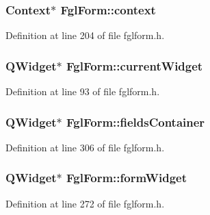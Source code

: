 \hypertarget{classFglForm_ad88a7b19b295fe1f14de652a9e3e1c17}{
\subsubsection[{context}]{\setlength{\rightskip}{0pt plus 5cm}Context$\ast$ {\bf FglForm::context}}}
\label{classFglForm_ad88a7b19b295fe1f14de652a9e3e1c17}


Definition at line 204 of file fglform.h.

\hypertarget{classFglForm_abce220040f982717756bfc10b51dac44}{
\subsubsection[{currentWidget}]{\setlength{\rightskip}{0pt plus 5cm}QWidget$\ast$ {\bf FglForm::currentWidget}}}
\label{classFglForm_abce220040f982717756bfc10b51dac44}


Definition at line 93 of file fglform.h.

\hypertarget{classFglForm_a67c8174c2d61e69e76c3206766fe3ac9}{
\subsubsection[{fieldsContainer}]{\setlength{\rightskip}{0pt plus 5cm}QWidget$\ast$ {\bf FglForm::fieldsContainer}}}
\label{classFglForm_a67c8174c2d61e69e76c3206766fe3ac9}


Definition at line 306 of file fglform.h.

\hypertarget{classFglForm_a382565fe4e148f5e37aabea41e079809}{
\subsubsection[{formWidget}]{\setlength{\rightskip}{0pt plus 5cm}QWidget$\ast$ {\bf FglForm::formWidget}}}
\label{classFglForm_a382565fe4e148f5e37aabea41e079809}


Definition at line 272 of file fglform.h.

